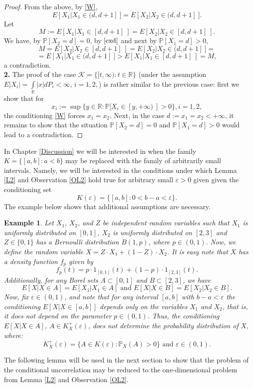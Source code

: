 \documentclass[sn-mathphys,Numbered,11pt]{sn-jnl}%
\theoremstyle{thmstyleone}%
\newtheorem{example}{Example}}
\newcommand{\eps}{\varepsilon}
\newcommand{\R}{\mathbb{R}}
\newcommand{\PP}{\mathbb{P}}
\newcommand{\KK}{\mathcal{K}}
\begin{document}
\begin{proof}
From the above, by \eqref{W},
\begin{equation}\label{exd}E[X_1|X_1\in (d,d+1]\ ]=E[X_2|X_2\in (d,d+1]\ ].\end{equation}
Let
$$M:=E[X_1|X_1\in [d,d+1]\ ]=E[X_2|X_2\in [d,d+1]\ ].$$
We have, by $\PP[X_2=d]=0$, by $\eqref{exd}$ and next by $\PP[X_1=d]>0$,
$$M=E[X_2|X_2\in[d,d+1]\ ]= E[X_2|X_2\in(d,d+1]\ ]=$$
$$=E[X_1|X_1\in(d,d+1]\ ]>E[X_1|X_1\in[d,d+1]\ ]=M, $$
a contradiction.\\
\textbf{2.} The proof of the case  $\KK=\{[t,\infty)\colon t\in\R\}$ (under the assumption $E|X_i|=\int\limits_{\R}|x|dP_i<\infty$, $i=1,2,$) is rather similar to the previous case: first we show that for
$$x_i:=\sup\{y\in\R\colon \PP[X_i\in [y,+\infty)\ ]>0\}, i=1,2, $$
the conditioning  \eqref{W} forces $x_1=x_2$. Next,  in the case $d:=x_1=x_2<+\infty$, it remains to show that the situation $\PP[X_2=d]=0$ and $\PP[X_1=d]>0$ would lead to a contradiction.
\end{proof}

 In Chapter \ref{Discussion} we will be interested in when the family $K=\{[a,b]\colon a< b\}$ may be replaced with the family of arbitrarily small intervals. Namely, we  will be interested in the conditions under which Lemma \ref{L2} and Observation \ref{OL2} hold true for arbitrary small $\eps>0$ given  given the conditioning  set 
$$K(\eps)=\{[a,b]\colon 0<b-a<\eps\}.$$
 The example below shows that  additional assumptions are necessary. 

\begin{example}\label{LCC}
Let $X_1$, $X_2$, and $Z$ be independent random variables such that $X_1$ is uniformly distributed on $[0,1]$, $X_2$ is uniformly distributed on $[2,3]$ and $Z\in\{0,1\}$ has a Bernoulli distribution $B(1,p)$, where $p\in (0,1)$. Now, we define the random variable $X=Z\cdot X_1 + (1-Z)\cdot X_2$. It is easy note that $X$ has a density function $f_p$ given by 
$$f_p(t)=p\cdot 1_{[0,1]}(t)+(1-p)\cdot 1_{[2,3]}(t).$$ Additionally, for any Borel sets
$A\subset [0,1]$ and $B\subset[2,3]$, we have
$$E[X|X\in A]=E[X_1|X_1\in A]\mbox{ and } E[X|X\in B]=E[X_2|X_2\in B].$$
Now, fix $\eps\in (0,1)$, and note that for any interval $[a,b]$ with $b-a<\eps$ the conditioning $E[X|X\in [a,b]]$ depends only on the variables $X_1$ and $X_2$, that is, it does not depend on the parameter $p\in (0,1)$. Thus, the conditioning $E[X|X\in A]$, $A\in K^+_{X}(\eps)$, does not determine the probability distribution of $X$, where:
$$ K^+_{X}(\eps)=\{A\in K(\eps)\colon \PP_X(A)>0\}\mbox{ and }\eps\in (0,1).$$
\end{example}
\bigskip
The following lemma will be used in the next section to show that the problem of the conditional uncorrelation may be reduced to the one-dimensional problem from Lemma \ref{L2} and Observation \ref{OL2}.
\end{document}
